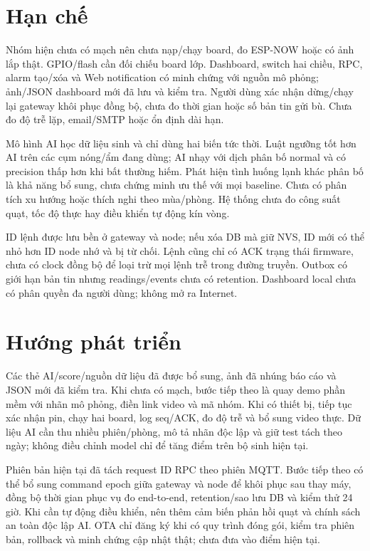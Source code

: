 \section{Hạn chế}
Nhóm hiện chưa có mạch nên chưa nạp/chạy board, đo ESP-NOW hoặc có ảnh lắp thật. GPIO/flash cần đối chiếu board lớp. Dashboard, switch hai chiều, RPC, alarm tạo/xóa và Web notification có minh chứng với nguồn mô phỏng; ảnh/JSON dashboard mới đã lưu và kiểm tra. Người dùng xác nhận dừng/chạy lại gateway khôi phục đồng bộ, chưa đo thời gian hoặc số bản tin gửi bù. Chưa đo độ trễ lặp, email/SMTP hoặc ổn định dài hạn.

Mô hình AI học dữ liệu sinh và chỉ dùng hai biến tức thời. Luật ngưỡng tốt hơn AI trên các cụm nóng/ẩm đang dùng; AI nhạy với dịch phân bố normal và có precision thấp hơn khi bất thường hiếm. Phát hiện tình huống lạnh khác phân bố là khả năng bổ sung, chưa chứng minh ưu thế với mọi baseline. Chưa có phân tích xu hướng hoặc thích nghi theo mùa/phòng. Hệ thống chưa đo công suất quạt, tốc độ thực hay điều khiển tự động kín vòng.

ID lệnh được lưu bền ở gateway và node; nếu xóa DB mà giữ NVS, ID mới có thể nhỏ hơn ID node nhớ và bị từ chối. Lệnh cũng chỉ có ACK trạng thái firmware, chưa có clock đồng bộ để loại trừ mọi lệnh trễ trong đường truyền. Outbox có giới hạn bản tin nhưng readings/events chưa có retention. Dashboard local chưa có phân quyền đa người dùng; không mở ra Internet.

\section{Hướng phát triển}
Các thẻ AI/score/nguồn dữ liệu đã được bổ sung, ảnh đã nhúng báo cáo và JSON mới đã kiểm tra. Khi chưa có mạch, bước tiếp theo là quay demo phần mềm với nhãn mô phỏng, điền link video và mã nhóm. Khi có thiết bị, tiếp tục xác nhận pin, chạy hai board, log seq/ACK, đo độ trễ và bổ sung video thực. Dữ liệu AI cần thu nhiều phiên/phòng, mô tả nhãn độc lập và giữ test tách theo ngày; không điều chỉnh model chỉ để tăng điểm trên bộ sinh hiện tại.

Phiên bản hiện tại đã tách request ID RPC theo phiên MQTT. Bước tiếp theo có thể bổ sung command epoch giữa gateway và node để khôi phục sau thay máy, đồng bộ thời gian phục vụ đo end-to-end, retention/sao lưu DB và kiểm thử 24 giờ. Khi cần tự động điều khiển, nên thêm cảm biến phản hồi quạt và chính sách an toàn độc lập AI. OTA chỉ đăng ký khi có quy trình đóng gói, kiểm tra phiên bản, rollback và minh chứng cập nhật thật; chưa đưa vào điểm hiện tại.
